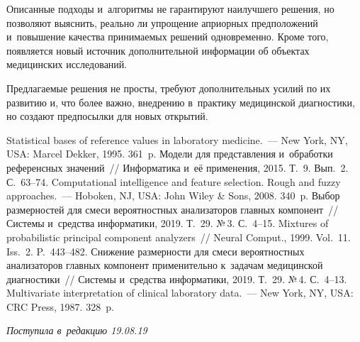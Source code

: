 \begin{multicols}{2}
     Описанные подходы и~алгоритмы не гарантируют наилучшего решения, 
но позволяют выяснить, реально ли упрощение априорных предположений 
и~повышение качества принимаемых решений одновременно. Кроме того, 
появляется новый источник дополнительной информации об объектах 
медицинских исследований.
     
     Предлагаемые решения не просты, требуют дополнительных усилий по 
их развитию и, что более важно, внедрению в~практику медицинской 
диагностики, но создают предпосылки для новых открытий.

\vspace*{-9pt}
     
{\small\frenchspacing
 {%
 \begin{thebibliography}{9}
 
 \vspace*{-3pt}
 
 Statistical bases of reference values in laboratory 
medicine.~--- New York, NY, USA: Marcel Dekker, 1995. 361~p.
 Модели для представления и~обработки референсных 
значений~// Информатика и~её применения, 2015. Т.~9. Вып.~2. С.~63--74.
 Computational intelligence and feature selection. Rough 
and fuzzy approaches.~--- Hoboken, NJ, USA: John Wiley \& Sons, 2008. 340~p. 
 Выбор размерностей для смеси вероятностных 
анализаторов главных компонент~// Системы и~средства информатики, 2019. 
Т.~29. №\,3. С.~4--15.
 Mixtures of probabilistic principal component 
analyzers~// Neural Comput., 1999. Vol.~11. Iss.~2. P.~443--482.
 Снижение размерности для смеси вероятностных 
анализаторов главных компонент применительно к~задачам медицинской 
диагностики~// Системы и~средства информатики, 2019. Т.~29. №\,4. С.~4--13.
 Multivariate interpretation of clinical laboratory 
data.~--- New York, NY, USA: CRC Press, 1987. 328~p.
 \end{thebibliography}

 }
 }

\end{multicols}

\vspace*{-6pt}

\hfill{\small\textit{Поступила в~редакцию 19.08.19}}

